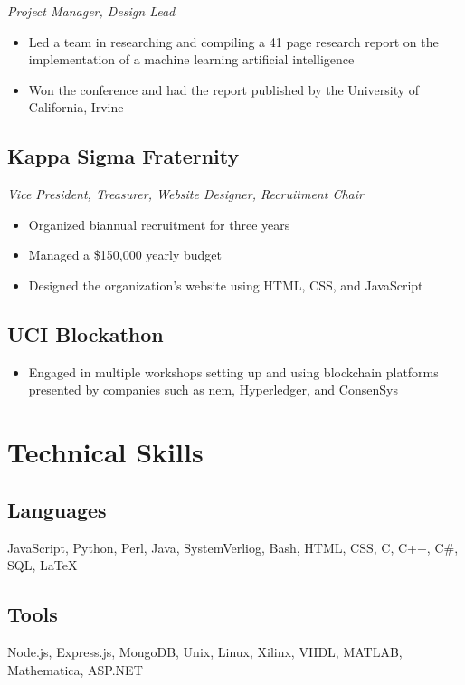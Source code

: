 \documentclass[10pt]{article}
\begin{document}
\noindent\textit{Project Manager, Design Lead}

\begin{itemize}
	\setlength\itemsep{0em}
	\item Led a team in researching and compiling a 41 page research report on the implementation of a machine learning artificial intelligence
	\item Won the conference and had the report published by the University of California, Irvine
\end{itemize}

\subsection{Kappa Sigma Fraternity}

\noindent\textit{Vice President, Treasurer, Website Designer, Recruitment Chair}

\begin{itemize}
	\setlength\itemsep{0em}
	\item Organized biannual recruitment for three years
	\item Managed a \$150,000 yearly budget
	\item Designed the organization's website using HTML, CSS, and JavaScript
\end{itemize}

\subsection{UCI Blockathon}

\begin{itemize}
	\setlength\itemsep{0em}
	\item Engaged in multiple workshops setting up and using blockchain platforms presented by companies such as nem, 
Hyperledger, and ConsenSys
\end{itemize}

\section{Technical Skills}

\subsection{Languages}

JavaScript, Python, Perl, Java, SystemVerliog, Bash, HTML, CSS, C, C++, C\#, SQL, \LaTeX

\subsection{Tools}

Node.js, Express.js, MongoDB, Unix, Linux, Xilinx, VHDL, MATLAB, Mathematica, ASP.NET
\end{document}
